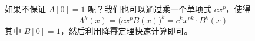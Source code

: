 如果不保证 $A[0] = 1$ 呢？我们也可以通过乘一个单项式 $cx^p$，使得
\[
A^k(x) = \bigl(cx^p B(x)\bigr)^k = c^k x^{pk} \cdot B^k(x)
\]
其中 $B[0] = 1$，然后利用降幂定理快速计算即可。